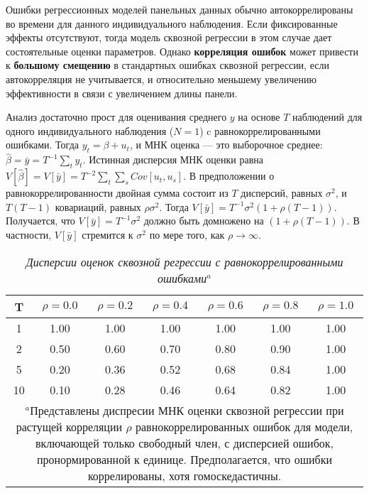 Ошибки регрессионных моделей панельных данных обычно автокоррелированы во времени для данного индивидуального наблюдения. Если фиксированные эффекты отсутствуют, тогда модель сквозной регрессии в этом случае дает состоятельные оценки параметров. Однако \textbf{корреляция ошибок} может привести к \textbf{большому смещению} в стандартных ошибках сквозной регрессии, если автокорреляция не учитывается, и относительно меньшему увеличению эффективности в связи с увеличением длины панели.

Анализ достаточно прост для оценивания среднего $y$ на основе $T$ наблюдений для одного индивидуального наблюдения ($N=1$) c равнокоррелированными ошибками. Тогда $y_t=\beta + u_t$, и МНК оценка --- это выборочное среднее: $\hat{\beta}=\bar{y}=T^{-1} \sum_t y_t$. Истинная дисперсия МНК оценки равна $V[\hat{\beta}]=V[\bar{y}]=T^{-2}\sum_t \sum_s Cov[u_{t},u_{s}]$. В предположении о равнокоррелированности двойная сумма состоит из $T$ дисперсий, равных $\sigma^2$, и $T(T-1)$ ковариаций, равных $\rho \sigma^2$. Тогда $V[\bar{y}]=T^{-1}\sigma^2(1+\rho (T-1))$. Получается, что $V[\bar{y}]=T^{-1}\sigma^2$ должно быть домножено на $(1+\rho (T-1))$. В частности, $V[\bar{y}]$ стремится к $\sigma^2$ по мере того, как $\rho \rightarrow \infty$.

\begin{table}[ht]
\caption{{\it Дисперсии оценок сквозной регрессии с равнокоррелированными ошибками$^a$}} 
\centering
\begin{tabular}{ccccccc}
\hline \hline
	\textbf{T} & $\rho=\mathbf{0.0}$& $\rho=\mathbf{0.2}$	& $\rho=\mathbf{0.4}$	& $\rho=\mathbf{0.6}$	& $\rho=\mathbf{0.8}$	& $\rho=\mathbf{1.0}$ \\
\hline
1	&1.00	&1.00	&1.00	&1.00	&1.00	&1.00\\
2	&0.50	&0.60	&0.70	&0.80	&0.90	&1.00\\
5	&0.20	&0.36	&0.52	&0.68	&0.84	&1.00\\
10	&0.10	&0.28	&0.46	&0.64	&0.82	&1.00\\
\hline \hline
\multicolumn{7}{p{14cm}}{$^a$Представлены диспресии МНК оценки сквозной регрессии при растущей корреляции $\rho$ равнокоррелированных ошибок для модели, включающей только свободный член, с дисперсией ошибок, пронормированной к единице. Предполагается, что ошибки коррелированы, хотя гомоскедастичны.} \\
\end{tabular}
\label{Tab:21.6}
\end{table}

